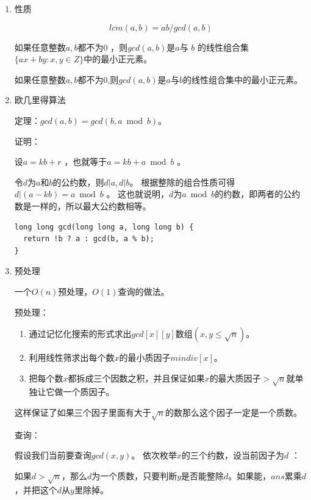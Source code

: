 \documentclass[11pt]{article}
\begin{document}
\begin{enumerate}
\item 性质
\label{sec:org16213b9}

\[
lcm(a,b) = ab/gcd(a,b)
\]

如果任意整数\(a,b\)都不为\(0\) ，则\(gcd(a,b)\)是\(a\)与 \(b\) 的线性组合集\(\{ax+by:x,y \in Z\}\)中的最小正元素。

如果任意整数\(a,b\)都不为\(0\),则\(gcd(a,b)\)是\(a\)与\(b\)的线性组合集中的最小正元素。

\item 欧几里得算法
\label{sec:org86c6088}

定理：\(gcd(a, b) = gcd(b, a \bmod b)\)。

证明：

设\(a = kb + r\) ，也就等于\(a = kb + a \bmod b\) 。

令\(d\)为\(a\)和\(b\)的公约数，则\(d|a,d|b\)。 根据整除的组合性质可得\(d|(a-kb)=a \bmod b\) 。
这也就说明，\(d\)为\(a \bmod b\)的约数，即两者的公约数是一样的，所以最大公约数相等。

\begin{verbatim}
long long gcd(long long a, long long b) {
  return !b ? a : gcd(b, a % b);
}
\end{verbatim}

\item 预处理
\label{sec:org2300809}

一个\(O(n)\)预处理，\(O(1)\)查询的做法。

预处理：

\begin{enumerate}
\item 通过记忆化搜索的形式求出\(gcd[x][y]\)数组\((x,y \leq\sqrt{n})\)。

\item 利用线性筛求出每个数\(x\)的最小质因子\(mindiv[x]\)。

\item 把每个数\(x\)都拆成三个因数之积，并且保证如果\(x\)的最大质因子\(> \sqrt{n}\)就单独让它做一个质因子。
\end{enumerate}

这样保证了如果三个因子里面有大于\(\sqrt{n}\)的数那么这个因子一定是一个质数。

查询：

假设我们当前要查询\(gcd(x,y)\)。 依次枚举\(x\)的三个约数，设当前因子为\(d\) ：

如果\(d>\sqrt{n}\)，那么\(d\)为一个质数，只要判断\(y\)是否能整除\(d\)。如果能，\(ans\)累乘\(d\)，并把这个\(d\)从\(y\)里除掉。


\end{enumerate}
\end{document}

